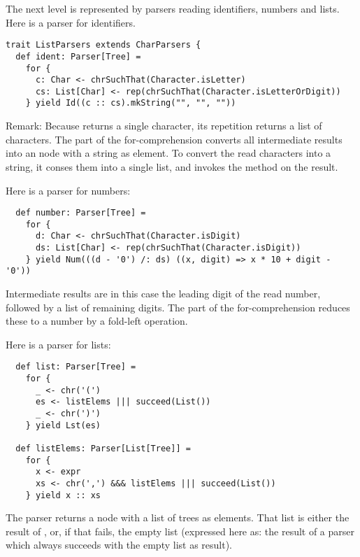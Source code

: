 {The next level is represented by parsers reading identifiers, numbers
and lists. Here is a parser for identifiers.
\begin{lstlisting}
trait ListParsers extends CharParsers {
  def ident: Parser[Tree] = 
    for {
      c: Char <- chrSuchThat(Character.isLetter)
      cs: List[Char] <- rep(chrSuchThat(Character.isLetterOrDigit))
    } yield Id((c :: cs).mkString("", "", ""))
\end{lstlisting}
Remark: Because  returns a single character, its
repetition  returns a list of characters. The
 part of the for-comprehension converts all intermediate
results into an  node with a string as element.  To convert
the read characters into a string, it conses them into a single list,
and invokes the  method on the result.

Here is a parser for numbers:
\begin{lstlisting}
  def number: Parser[Tree] =
    for {
      d: Char <- chrSuchThat(Character.isDigit)
      ds: List[Char] <- rep(chrSuchThat(Character.isDigit))
    } yield Num(((d - '0') /: ds) ((x, digit) => x * 10 + digit - '0'))
\end{lstlisting}
Intermediate results are in this case the leading digit of
the read number, followed by a list of remaining digits.  The
 part of the for-comprehension reduces these to a number
by a fold-left operation.

Here is a parser for lists:
\begin{lstlisting}
  def list: Parser[Tree] = 
    for {
      _ <- chr('(')
      es <- listElems ||| succeed(List())
      _ <- chr(')')
    } yield Lst(es)

  def listElems: Parser[List[Tree]] = 
    for {
      x <- expr
      xs <- chr(',') &&& listElems ||| succeed(List())
    } yield x :: xs
\end{lstlisting}
The  parser returns a  node with a list of trees
as elements.  That list is either the result of , or,
if that fails, the empty list (expressed here as: the result of a
parser which always succeeds with the empty list as result).

}
